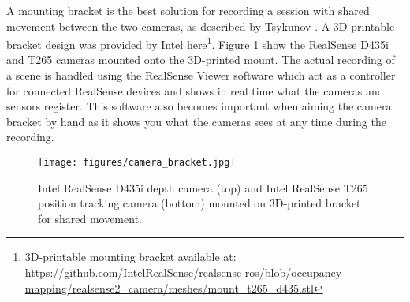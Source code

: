 A mounting bracket is the best solution for recording a session with shared movement between the two cameras, as described by Tsykunov \cite{tsykunov2020}. A 3D-printable bracket design was provided by Intel here\footnote{3D-printable mounting bracket available at: \url{https://github.com/IntelRealSense/realsense-ros/blob/occupancy-mapping/realsense2_camera/meshes/mount_t265_d435.stl}}. Figure \ref{fig:bracket} show the RealSense D435i and T265 cameras mounted onto the 3D-printed mount. The actual recording of a scene is handled using the RealSense Viewer software which act as a controller for connected RealSense devices and shows in real time what the cameras and sensors register. This software also becomes important when aiming the camera bracket by hand as it shows you what the cameras sees at any time during the recording.

\begin{figure}[h]
    \texttt{[image: figures/camera\_bracket.jpg]}
    \caption{Intel RealSense D435i depth camera (top) and Intel RealSense T265 position tracking camera (bottom) mounted on 3D-printed bracket for shared movement.}
    \centering
    \label{fig:bracket}
\end{figure}

